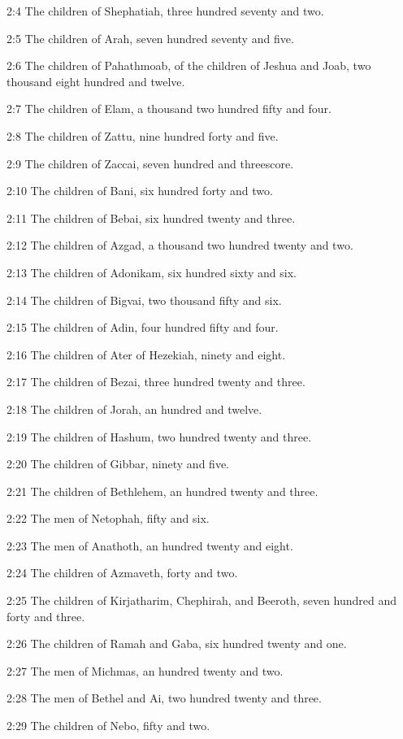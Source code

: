 2:4 The children of Shephatiah, three hundred seventy and two.

2:5 The children of Arah, seven hundred seventy and five.

2:6 The children of Pahathmoab, of the children of Jeshua and Joab, two thousand eight hundred and twelve.

2:7 The children of Elam, a thousand two hundred fifty and four.

2:8 The children of Zattu, nine hundred forty and five.

2:9 The children of Zaccai, seven hundred and threescore.

2:10 The children of Bani, six hundred forty and two.

2:11 The children of Bebai, six hundred twenty and three.

2:12 The children of Azgad, a thousand two hundred twenty and two.

2:13 The children of Adonikam, six hundred sixty and six.

2:14 The children of Bigvai, two thousand fifty and six.

2:15 The children of Adin, four hundred fifty and four.

2:16 The children of Ater of Hezekiah, ninety and eight.

2:17 The children of Bezai, three hundred twenty and three.

2:18 The children of Jorah, an hundred and twelve.

2:19 The children of Hashum, two hundred twenty and three.

2:20 The children of Gibbar, ninety and five.

2:21 The children of Bethlehem, an hundred twenty and three.

2:22 The men of Netophah, fifty and six.

2:23 The men of Anathoth, an hundred twenty and eight.

2:24 The children of Azmaveth, forty and two.

2:25 The children of Kirjatharim, Chephirah, and Beeroth, seven hundred and forty and three.

2:26 The children of Ramah and Gaba, six hundred twenty and one.

2:27 The men of Michmas, an hundred twenty and two.

2:28 The men of Bethel and Ai, two hundred twenty and three.

2:29 The children of Nebo, fifty and two.

